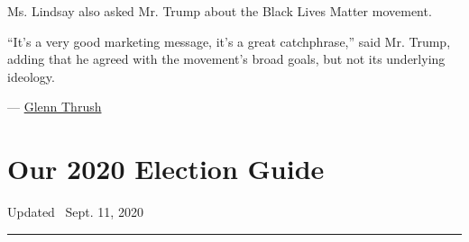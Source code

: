 Ms. Lindsay also asked Mr. Trump about the Black Lives Matter movement.

``It's a very good marketing message, it's a great catchphrase,'' said
Mr. Trump, adding that he agreed with the movement's broad goals, but
not its underlying ideology.

--- \href{https://www.nytimes3xbfgragh.onion/by/glenn-thrush}{Glenn
Thrush}

\hypertarget{our-2020-election-guide}{%
\section{Our 2020 Election Guide}\label{our-2020-election-guide}}

Updated ~Sept. 11, 2020

\begin{center}\rule{0.5\linewidth}{\linethickness}\end{center}

